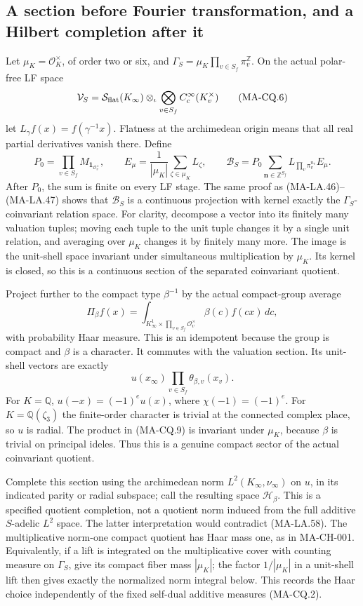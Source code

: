 \subsection{A section before Fourier transformation, and a Hilbert completion after it}

Let $\mu_K=\mathcal O_K^\times$, of order two or six, and
$\Gamma_S=\mu_K\prod_{v\in S_f}\pi_v^{\mathbb Z}$.
On the actual polar-free LF space
\[
 \mathcal V_S=
    \mathcal S_{\rm flat}(K_\infty)
       \mathbin{\otimes_\iota}
            \bigotimes_{v\in S_f} C_c^\infty(K_v^\times)
\tag{MA-CQ.6}
\]
let $L_\gamma f(x)=f(\gamma^{-1}x)$.
Flatness at the archimedean origin means that all real
partial derivatives vanish there.  Define
\[
 P_0=\prod_{v\in S_f}M_{\mathbf1_{\mathcal O_v^\times}},
 \qquad E_\mu=\frac1{|\mu_K|}\sum_{\zeta\in\mu_K}L_\zeta,
 \qquad
 \mathscr B_S=P_0
      \sum_{\mathbf n\in\mathbb Z^{S_f}}
             L_{\prod_v\pi_v^{n_v}}E_\mu .
\tag{MA-CQ.7}
\]
After $P_0$, the sum is finite on every LF stage.
The same proof as (MA-LA.46)--(MA-LA.47) shows that
$\mathscr B_S$ is a continuous projection with kernel
exactly the $\Gamma_S$-coinvariant relation space.
For clarity, decompose a vector into its finitely many
valuation tuples; moving each tuple to the unit tuple
changes it by a single unit relation, and averaging over
$\mu_K$ changes it by finitely many more.
The image is the unit-shell space invariant under
simultaneous multiplication by $\mu_K$.
Its kernel is closed, so this is a continuous section
of the separated coinvariant quotient.

Project further to the compact type $\beta^{-1}$ by
the actual compact-group average
\[
        \Pi_\beta f(x)=
            \int_{K_\infty^1\times\prod_{v\in S_f}\mathcal O_v^\times}
                            \beta(c)f(cx)\,dc ,
\tag{MA-CQ.8}
\]
with probability Haar measure.
This is an idempotent because the group is compact
and $\beta$ is a character.  It commutes with the
valuation section.  Its unit-shell vectors are exactly
\[
                u(x_\infty)\prod_{v\in S_f}\theta_{\beta,v}(x_v).
\tag{MA-CQ.9}
\]
For $K=\mathbb Q$, $u(-x)=(-1)^e u(x)$, where
$\chi(-1)=(-1)^e$.
For $K=\mathbb Q(\zeta_3)$ the finite-order character
is trivial at the connected complex place, so $u$
is radial.  The product in (MA-CQ.9) is invariant
under $\mu_K$, because $\beta$ is trivial on
principal ideles.  Thus this is a genuine compact
sector of the actual coinvariant quotient.

Complete this section using the archimedean norm
$L^2(K_\infty,\nu_\infty)$ on $u$, in its indicated
parity or radial subspace; call the resulting space
$\mathscr H_\beta$.  This is a specified quotient
completion, not a quotient norm induced from the
full additive $S$-adelic $L^2$ space.
The latter interpretation would contradict
(MA-LA.58).
The multiplicative norm-one compact quotient has
Haar mass one, as in MA-CH-001.
Equivalently, if a lift is integrated on the
multiplicative cover with counting measure on
$\Gamma_S$, give its compact fiber mass $|\mu_K|$;
the factor $1/|\mu_K|$ in a unit-shell lift then
gives exactly the normalized norm integral below.
This records the Haar choice independently of the
fixed self-dual additive measures (MA-CQ.2).

